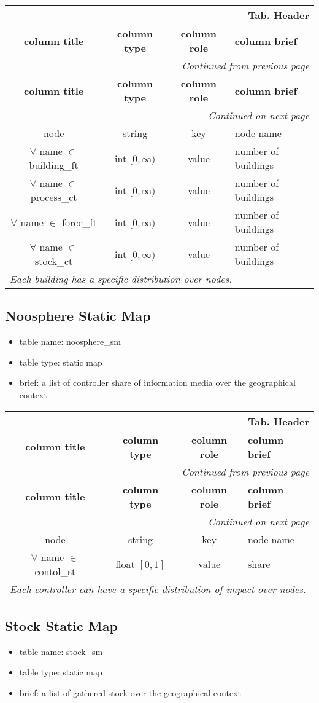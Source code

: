 \documentclass[a4paper,oneside,titlepage]{report}
\newcommand*{\LTHeaderIV}[5]{
  \multicolumn{4}{r}{\textbf{Tab. \thesubsection} \textbf{#1}}\\    
  \hline
  \textbf{#2} & \textbf{#3} & \textbf{#4} & \textbf{#5}\\
  \hline
  
  \endfirsthead
  \multicolumn{4}{r}{\textit{Continued from previous page}}\\    
  \hline
  \textbf{#2} & \textbf{#3} & \textbf{#4} & \textbf{#5}\\
  \hline
  \endhead
  \hline
  \multicolumn{4}{r}{\textit{Continued on next page}}\\
  \endfoot
  \hline
  \endlastfoot  
}
\begin{document}
\begin{longtable}{ |c|c|c|l| } 
  \LTHeaderIV{Header}{column title}{column type}{column role}{column brief}                    
  node & string & key & node name\\
  $\forall$ name $\in$ building\_ft & int $[0, \infty)$ & value & number of buildings \\
  $\forall$ name $\in$ process\_ct & int $[0, \infty)$ & value & number of buildings \\
  $\forall$ name $\in$ force\_ft & int $[0, \infty)$ & value & number of buildings \\
  $\forall$ name $\in$ stock\_ct & int $[0, \infty)$ & value & number of buildings \\
  \multicolumn{4}{|l|}{\textit{Each building has a specific distribution over nodes.}}\\
\end{longtable}        

\subsection{Noosphere Static Map}
\begin{itemize}
  \setlength{\itemsep}{0pt}
  \setlength{\parskip}{0pt}
\item table name: noosphere\_sm  
\item table type: static map  
\item brief: a list of controller share of information media over the geographical context
\end{itemize}

\begin{longtable}{ |c|c|c|l| } 
  \LTHeaderIV{Header}{column title}{column type}{column role}{column brief}                    
  node & string & key & node name\\
  $\forall$ name $\in$ contol\_st & float $[0, 1]$ & value & share \\
  \multicolumn{4}{|l|}{\textit{Each controller can have a specific distribution of impact over nodes.}}\\
\end{longtable}        

\subsection{Stock Static Map}
\begin{itemize}
  \setlength{\itemsep}{0pt}
  \setlength{\parskip}{0pt}
\item table name: stock\_sm  
\item table type: static map  
\item brief: a list of gathered stock over the geographical context
\end{itemize}
\end{document}
